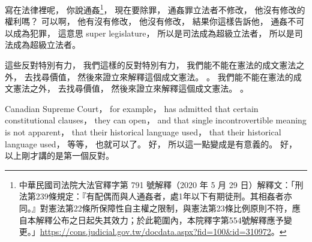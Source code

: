 \hypertarget{w02:cue:2313}{}寫在法律裡呢，
\hypertarget{w02:cue:2314}{}你說通姦\footnote{中華民國司法院大法官釋字第 791 號解釋（2020 年 5 月 29 日）解釋文：「刑法第239條規定：『有配偶而與人通姦者，處1年以下有期徒刑。其相姦者亦同。』對憲法第22條所保障性自主權之限制，與憲法第23條比例原則不符，應自本解釋公布之日起失其效力；於此範圍內，本院釋字第554號解釋應予變更。」\url{https://cons.judicial.gov.tw/docdata.aspx?fid=100&id=310972}。}，
\hypertarget{w02:cue:2315}{}現在要除罪，
\hypertarget{w02:cue:2316}{}通姦罪立法者不修改，
\hypertarget{w02:cue:2317}{}他沒有修改的權利嗎？
\hypertarget{w02:cue:2318}{}可以啊，
\hypertarget{w02:cue:2319}{}他有沒有修改，
\hypertarget{w02:cue:2320}{}他沒有修改，
\hypertarget{w02:cue:2321}{}結果你這樣告訴他，
\hypertarget{w02:cue:2322}{}通姦不可以成為犯罪，
\hypertarget{w02:cue:2323}{}這意思 super legislature，
\hypertarget{w02:cue:2324}{}所以是司法成為超級立法者，
\hypertarget{w02:cue:2325}{}所以是司法成為超級立法者。

\hypertarget{w02:cue:2326}{}這些反對特別有力，
\hypertarget{w02:cue:2327}{}我們這樣的反對特別有力，
\hypertarget{w02:cue:2328}{}我們能不能在憲法的成文憲法之外，
\hypertarget{w02:cue:2329}{}去找尋價值，
\hypertarget{w02:cue:2330}{}然後來證立來解釋這個成文憲法。
\hypertarget{w02:cue:2331}{}。
\hypertarget{w02:cue:2332}{}我們能不能在憲法的成文憲法之外，
\hypertarget{w02:cue:2333}{}去找尋價值，
\hypertarget{w02:cue:2334}{}然後來證立來解釋這個成文憲法。
\hypertarget{w02:cue:2335}{}。

\hypertarget{w02:cue:2336}{}Canadian Supreme Court，
\hypertarget{w02:cue:2337}{}for example，
\hypertarget{w02:cue:2338}{}has admitted that certain constitutional clauses，
\hypertarget{w02:cue:2339}{}they can open，
\hypertarget{w02:cue:2340}{}and that single incontrovertible meaning is not apparent，
\hypertarget{w02:cue:2341}{}that their historical language used，
\hypertarget{w02:cue:2342}{}that their historical language used，
\hypertarget{w02:cue:2343}{}等等，
\hypertarget{w02:cue:2344}{}也就可以了。
\hypertarget{w02:cue:2345}{}好，
\hypertarget{w02:cue:2346}{}所以這一點變成是有意義的。
\hypertarget{w02:cue:2347}{}好，
\hypertarget{w02:cue:2348}{}以上剛才講的是第一個反對。

